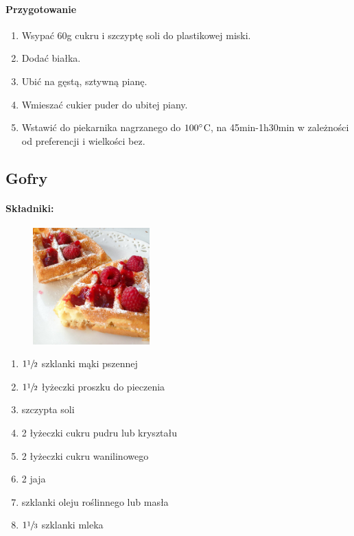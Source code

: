 \documentclass{article}
\begin{document}
    \paragraph{Przygotowanie}
    \begin{enumerate}
        \item Wsypać 60g cukru i szczyptę soli do plastikowej miski.
        \item Dodać białka.
        \item Ubić na gęstą, sztywną pianę.
        \item Wmieszać cukier puder do ubitej piany.
        \item Wstawić do piekarnika nagrzanego do $100\degree$C, na
            45min-1h30min w zależności od preferencji i wielkości bez.
    \end{enumerate}
    \newpage

    \subsection{Gofry}
    \bigskip
    \paragraph{Składniki:}
    \begin{figure}
        \includegraphics[width=0.4\textwidth]{gofry.jpg}
    \end{figure}
    \begin{enumerate}
        \item $1\sfrac{1}{2}$ szklanki mąki pszennej
        \item $1\sfrac{1}{2}$ łyżeczki proszku do pieczenia
        \item szczypta soli
        \item 2 łyżeczki cukru pudru lub kryształu
        \item 2 łyżeczki cukru wanilinowego
        \item 2 jaja
        \item {} szklanki oleju roślinnego lub masła
        \item $1\sfrac{1}{3}$ szklanki mleka
    \end{enumerate}
\end{document}
